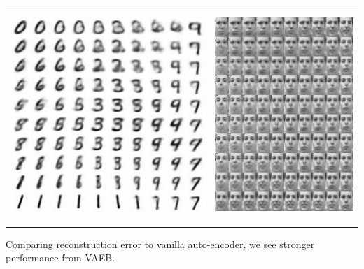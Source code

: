 \documentclass[landscape,a0b,final,a4resizeable]{include/a0poster}
\begin{document}
\begin{poster}
\begin{multicols}{3}
\begin{tabular}{cc}
\begin{minipage}[c]{0.48\columnwidth}
\hspace{2em}
\includegraphics[width=.6\columnwidth]{../freyFaces/MNIST}
\end{minipage} & 
\begin{minipage}[c]{0.48\columnwidth}
\begin{center}
\vspace{0.5cm}
\includegraphics[width=.5\columnwidth]{../freyFaces/FREY}
\end{center}
\end{minipage}
\end{tabular}

\vspace{0.5em}

Comparing reconstruction error to vanilla auto-encoder, we see stronger performance from VAEB.


\end{multicols}
\end{poster}
\end{document}
